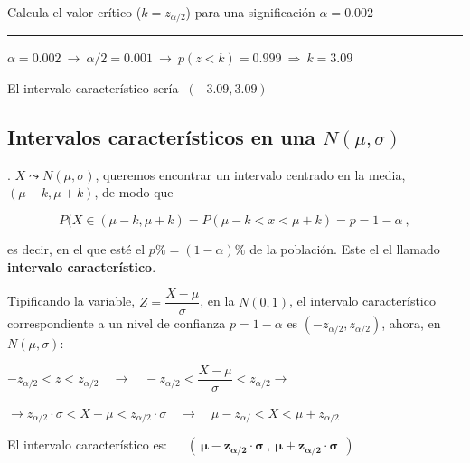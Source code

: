 \begin{ejemplo}
\begin{ejre}
	Calcula el valor crítico ($k=z_{\alpha/2}$) 	para una significación $\alpha=0.002$

\rule{150pt}{0.1pt}

$\alpha=0.002 \ \to \ \alpha/2=0.001 \ \to \ p(z<k)=0.999 \ \Rightarrow \ k=3.09$

El intervalo característico sería $\ (-3.09,3.09)$
\end{ejre}	
\end{ejemplo}

\vspace{4mm} %
\subsection{Intervalos característicos en una $N(\mu,\sigma)$}


\vspace{4mm} %
\begin{definition}
.		$X \leadsto N(\mu,\sigma)$, queremos encontrar un intervalo centrado en la media, $(\mu-k,\mu+k)$, de modo que 

$$P(X\in(\mu-k,\mu+k)=P(\mu-k<x<\mu+k)=p=1-\alpha\ ,$$

\vspace{2mm}  es decir, en el que esté el $p\%=(1-\alpha)\%$ de la población.
Este el el llamado \textbf{intervalo característico}.

\vspace{3mm} Tipificando la variable, $Z=\dfrac{X-\mu}{\sigma}$, en la $N(0,1)$, el intervalo característico correspondiente a un nivel de confianza $p=1-\alpha$ es $(-z_{\alpha/2},z_{\alpha/2})$, ahora, en $N(\mu,\sigma)$:

\vspace{2mm} \hspace{1cm} $-z_{\alpha/2}<z<z_{\alpha/2} \quad \to \quad -z_{\alpha/2}<\dfrac{X-\mu}{\sigma}<z_{\alpha/2} \to $

\vspace{2mm} \hspace{1cm} $\to z_{\alpha/2}\cdot \sigma < X-\mu < z_{\alpha/2}\cdot \sigma \quad \to \quad  \mu-z_{\alpha/}<X<\mu+z_{\alpha/2}$

\vspace{3mm} El intervalo característico es: $\quad \boxed{ \ \boldsymbol{ (\ \mu-z_{\alpha/2}\cdot \sigma\ , \ \mu+z_{\alpha/2}\cdot \sigma\ \ )  } \ }$

\end{definition}

